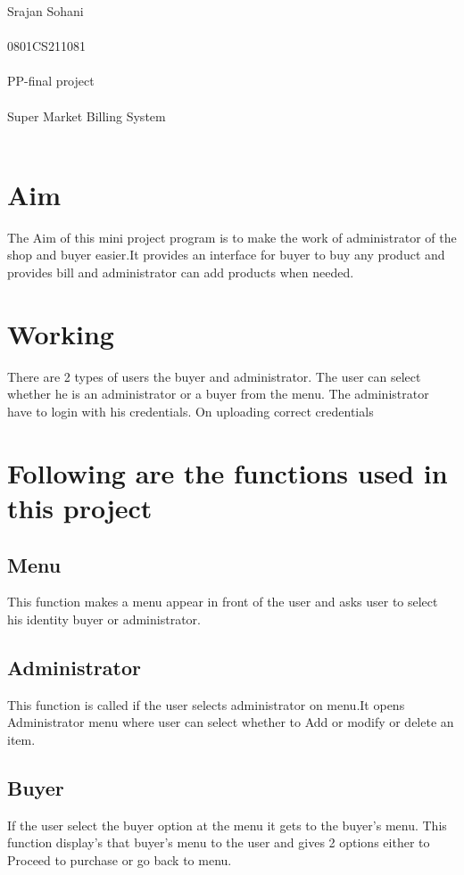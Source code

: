 \documentclass{article}
\begin{document}
\pagestyle{fancy}
\begin{center}
\begin{Huge}
Srajan Sohani \\ \\
0801CS211081 \\ \\
PP-final project \\ \\
Super Market Billing System\\ \\
\end{Huge}
\end{center}
\section{Aim}
The Aim of this mini project program is to make the work of administrator of the shop and buyer easier.It provides an interface for buyer to buy any product and provides bill and administrator can add products when needed.
\section{Working}
There are 2 types of users the buyer and administrator. The user can select whether he is an administrator or  a buyer from the menu. The  administrator have to login with his credentials. On uploading correct credentials 
\section{Following are the functions used in this project}
\subsection{Menu}
This function makes a menu appear in front of the user and asks user to select his identity buyer or administrator.
\subsection{Administrator}
This function is called if the user selects administrator on menu.It opens Administrator menu where user can select whether to Add  or modify or delete an item.
\subsection{Buyer}
If the user select the buyer option at the menu it gets to the buyer's menu. This function display's that buyer's menu to the user and gives 2 options either to Proceed to purchase or go back to menu.
\end{document}

